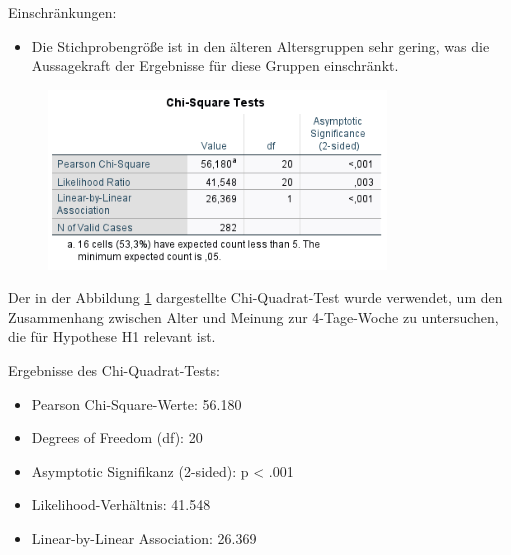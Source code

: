 Einschränkungen:
\begin{itemize}
    \item Die Stichprobengröße ist in den älteren Altersgruppen sehr gering, was die Aussagekraft der 
    Ergebnisse für diese Gruppen einschränkt.
\end{itemize}

\begin{figure}[h]
    \centering
    \includegraphics[width=0.8\textwidth]{04_Artefakte/01_Abbildungen/hypothese_1/h1_chi.png}
    \caption{}
    \label{fig:h1_chi}
\end{figure}

Der in der Abbildung \ref*{fig:h1_chi} dargestellte Chi-Quadrat-Test wurde verwendet, um den Zusammenhang 
zwischen Alter und Meinung zur 4-Tage-Woche zu untersuchen, die für Hypothese H1 relevant ist.

Ergebnisse des Chi-Quadrat-Tests:
\begin{itemize}
    \item Pearson Chi-Square-Werte: 56.180
    \item Degrees of Freedom (df): 20
    \item Asymptotic Signifikanz (2-sided): p < .001
    \item Likelihood-Verhältnis: 41.548
    \item Linear-by-Linear Association: 26.369
\end{itemize}

